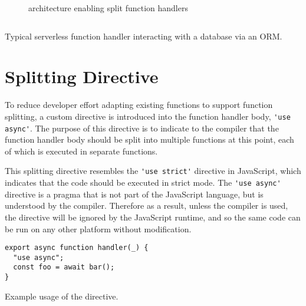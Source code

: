 \begin{figure}[htp]
    \centering
    \quad
    \caption{\faas{} architecture enabling split function handlers}
\end{figure}

\begin{listing}[H]
  \inputminted{javascript}{node_modules/@faaas-bench/hello-seq/src/onHttpGetHello.trigger.ts}
  \caption{Typical serverless function handler interacting with a database via an ORM.}
\end{listing}

\section{Splitting Directive}

To reduce developer effort adapting existing functions to support function splitting, a custom directive is introduced into the function handler body, \verb|'use async'|. The purpose of this directive is to indicate to the \faaasc{} compiler that the function handler body should be split into multiple functions at this point, each of which is executed in separate \awslambda{} functions.

This splitting directive resembles the \verb|'use strict'| directive in JavaScript, which indicates that the code should be executed in strict mode. The \verb|'use async'| directive is a pragma that is not part of the JavaScript language, but is understood by the \faaasc{} compiler. Therefore as a result, unless the \faaasc{} compiler is used, the directive will be ignored by the JavaScript runtime, and so the same code can be run on any other \faas{} platform without modification.

\begin{listing}[H]
\begin{verbatim}
export async function handler(_) {
  "use async";
  const foo = await bar();
}
\end{verbatim}
\caption{Example usage of the directive.}
\label{listing:use-async-simple-example}
\end{listing}

